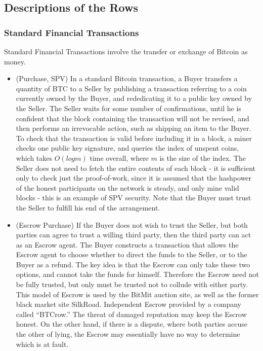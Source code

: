 \subsection{Descriptions of the Rows}

\subsubsection{Standard Financial Transactions}
Standard Financial Transactions involve the transfer or exchange of Bitcoin as money.
\begin{itemize}
\item (Purchase, SPV) In a standard Bitcoin transaction, a Buyer transfers a quantity of BTC to a Seller by publishing a transaction referring to a coin currently owned by the Buyer, and rededicating it to a public key owned by the Seller. The Seller waits for some number of confirmations, until he is confident that the block containing the transaction will not be revised, and then performs an irrevocable action, such as shipping an item to the Buyer. To check that the transaction is valid before including it in a block, a miner checks one public key signature, and queries the index of unspent coins, which takes $O(log m)$ time overall, where $m$ is the size of the index. The Seller does not need to fetch the entire contents of each block - it is sufficient only to check just the proof-of-work, since it is assumed that the hashpower of the honest participants on the network is steady, and only mine valid blocks - this is an example of SPV security. Note that the Buyer must trust the Seller to fulfill his end of the arrangement.

\item (Escrow Purchase) If the Buyer does not wish to trust the Seller, but both parties can agree to trust a willing third party, then the third party can act as an Escrow agent. The Buyer constructs a transaction that allows the Escrow agent to choose whether to direct the funds to the Seller, or to the Buyer as a refund. The key idea is that the Escrow can only take these two options, and cannot take the funds for himself. Therefore the Escrow need not be fully trusted, but only must be trusted not to collude with either party. This model of Escrow is used by the BitMit auction site, as well as the former black market site SilkRoad. Independent Escrow provided by a company called ``BTCrow.'' The threat of damaged reputation may keep the Escrow honest. On the other hand, if there is a dispute, where both parties accuse the other of lying, the Escrow may essentially have no way to determine which is at fault.


\end{itemize}
